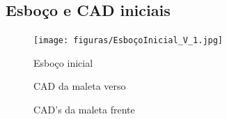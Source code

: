 \begin{apendicesenv}



\chapter{Esboço e CAD iniciais}
\label{CAD}

\begin{figure}[htb]
    \centering
    \texttt{[image: figuras/EsboçoInicial\_V\_1.jpg]}
    \caption{Esboço inicial}
    \label{fig:esboço}
\end{figure}

\begin{figure} [H]
\centering
  \caption{CAD da maleta verso}
\end{figure}

\begin{figure} [H]
\centering
  \caption{CAD's da maleta frente}
\end{figure}


\end{apendicesenv}
